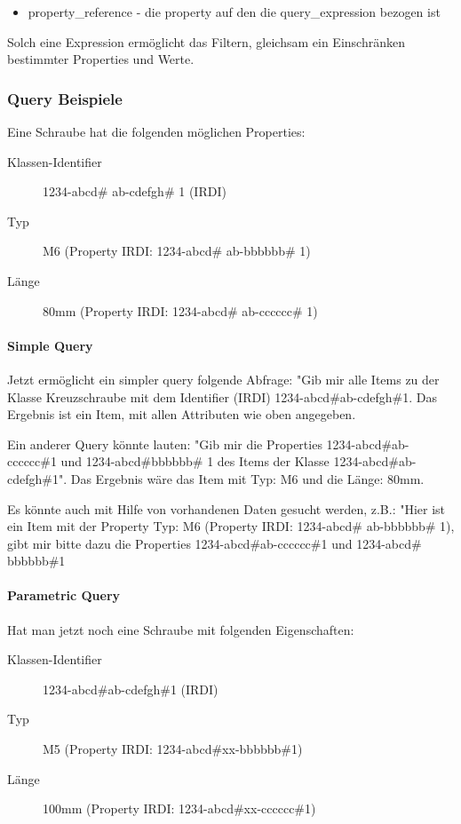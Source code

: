 \begin{itemize}
\item property\_reference - die property auf den die query\_expression bezogen ist
\end{itemize}
Solch eine Expression ermöglicht das Filtern, gleichsam ein Einschränken bestimmter Properties und Werte. 

\subsubsection{Query Beispiele}\label{kap:query_beispiele}

Eine Schraube hat die folgenden möglichen Properties: 

\begin{description}
\item[Klassen-Identifier] 1234-abcd\# ab-cdefgh\# 1 (IRDI)
\item[Typ] M6 (Property IRDI: 1234-abcd\# ab-bbbbbb\# 1)
\item[Länge] 80mm (Property IRDI: 1234-abcd\# ab-cccccc\# 1)
\end{description}

\paragraph{Simple Query}

Jetzt ermöglicht ein simpler query folgende Abfrage: "Gib mir alle Items zu der Klasse Kreuzschraube mit dem Identifier (IRDI) 1234-abcd\#ab-cdefgh\#1. Das Ergebnis ist ein Item, mit allen Attributen wie oben angegeben. 

Ein anderer Query könnte lauten: "Gib mir die Properties 1234-abcd\#ab-cccccc\#1 und 1234-abcd\#bbbbbb\# 1 des Items der Klasse 1234-abcd\#ab-cdefgh\#1". Das Ergebnis wäre das Item mit Typ: M6 und die Länge: 80mm.

Es könnte auch mit Hilfe von vorhandenen Daten gesucht werden, z.B.: "Hier ist ein Item mit der Property Typ: M6 (Property IRDI: 1234-abcd\# ab-bbbbbb\# 1), gibt mir bitte dazu die Properties 1234-abcd\#ab-cccccc\#1 und 1234-abcd\# bbbbbb\#1 

\paragraph{Parametric Query}

Hat man jetzt noch eine Schraube mit folgenden Eigenschaften:
\begin{description}
\item[Klassen-Identifier] 1234-abcd\#ab-cdefgh\#1 (IRDI)
\item[Typ] M5 (Property IRDI: 1234-abcd\#xx-bbbbbb\#1)
\item[Länge] 100mm (Property IRDI: 1234-abcd\#xx-cccccc\#1)
\end{description}


